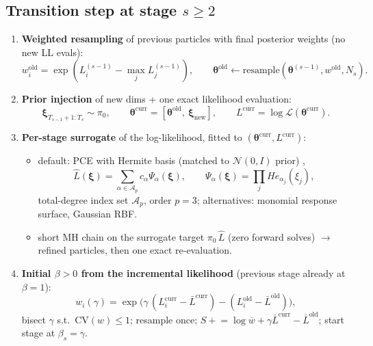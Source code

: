 \documentclass[11pt,a4paper]{article}
\newcommand{\bxi}{\boldsymbol{\xi}}          %
\newcommand{\bth}{\boldsymbol{\theta}}        %
\newcommand{\bL}{\mathcal{L}}                 %
\newcommand{\bpi}{\pi}                        %
\newcommand{\Ntot}{N}
\begin{document}
\subsection{Transition step at stage $s \ge 2$}
\begin{enumerate}
  \item \textbf{Weighted resampling} of previous particles with final posterior weights (no new LL evals):
    \begin{equation}
      w_i^{\mathrm{old}} = \exp(L_i^{(s-1)} - \max_j L_j^{(s-1)}),\qquad
      \bth^{\mathrm{old}} \leftarrow \mathrm{resample}(\bth^{(s-1)}, w^{\mathrm{old}}, \Ntot_s).
    \end{equation}
  \item \textbf{Prior injection} of new dims + one exact likelihood evaluation:
    \begin{equation}
      \bxi_{T_{s-1}+1:T_s} \sim \bpi_0,\qquad
      \bth^{\mathrm{curr}} = [\bth^{\mathrm{old}},\ \bxi_{\mathrm{new}}],\qquad
      L^{\mathrm{curr}} = \log\bL(\bth^{\mathrm{curr}}).
    \end{equation}
  \item \textbf{Per-stage surrogate} of the log-likelihood, fitted to $(\bth^{\mathrm{curr}}, L^{\mathrm{curr}})$:
    \begin{itemize}
      \item default: PCE with Hermite basis (matched to $\mathcal{N}(0,I)$ prior) \cite{wienerHeterogeneousChaos1938},
        \begin{equation}
          \hat L(\bxi) = \sum_{\alpha \in \mathcal{A}_p} c_\alpha \Psi_\alpha(\bxi),\qquad
          \Psi_\alpha(\bxi) = \prod_{j} He_{\alpha_j}(\xi_j),
        \end{equation}
        total-degree index set $\mathcal{A}_p$, order $p = 3$; alternatives: monomial response surface, Gaussian RBF.
      \item short MH chain on the surrogate target $\bpi_0\,\hat L$ (zero forward solves) $\rightarrow$ refined particles, then one exact re-evaluation.
    \end{itemize}
  \item \textbf{Initial $\beta > 0$ from the incremental likelihood} (previous stage already at $\beta = 1$):
    \begin{equation}
      w_i(\gamma) = \exp\big(\gamma\,(L_i^{\mathrm{curr}} - \bar L^{\mathrm{curr}}) - (L_i^{\mathrm{old}} - \bar L^{\mathrm{old}})\big),
    \end{equation}
    bisect $\gamma$ s.t.\ $\mathrm{CV}(w) \le 1$; resample once; $S \mathrel{+}= \log\overline{w} + \gamma\bar L^{\mathrm{curr}} - \bar L^{\mathrm{old}}$; start stage at $\beta_s = \gamma$.
\end{enumerate}
\end{document}
